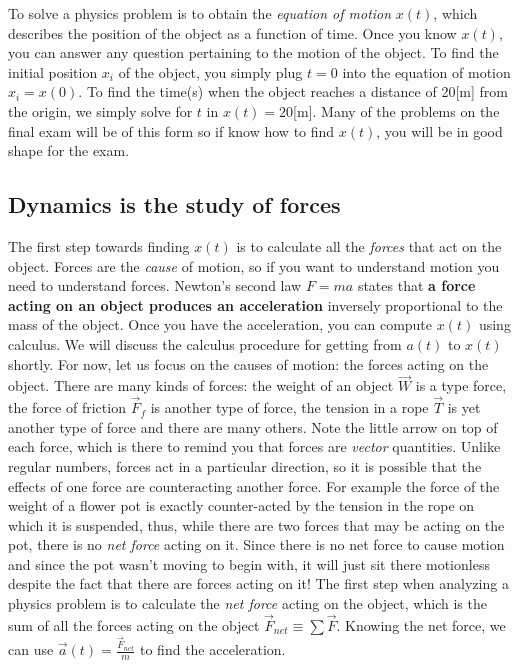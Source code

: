

To solve a physics problem is to obtain the \emph{equation of motion} $x(t)$, 
which describes the position of the object as a function of time.
%
Once you know $x(t)$, you can answer any question pertaining to the motion of the object.
To find the initial position $x_i$ of the object, you simply plug $t=0$ into the equation of motion $x_i = x(0)$.
To find the time(s) when the object reaches a distance of 20[m] from the origin, we simply solve for $t$ in $x(t)=20$[m].
Many of the problems on the final exam will be of this form so if know how to find $x(t)$,
you will be in good shape for the exam.

\vspace{-3mm}
\subsection{Dynamics is the study of forces}
The first step towards finding $x(t)$ is to calculate all the \emph{forces} that act on the object.
Forces are the \emph{cause} of motion, so if you want to understand motion you need to understand forces. 
Newton's second law $F=ma$ states that {\bf a force acting on an object produces an acceleration}
inversely proportional to the mass of the object. 
Once you have the acceleration, you can compute $x(t)$ using calculus.
We will discuss the calculus procedure for getting from $a(t)$ to $x(t)$ shortly.
For now, let us focus on the causes of motion: the forces acting on the object.
There are many kinds of forces: the weight of an object $\vec{W}$ is a type force, 
the force of friction $\vec{F}_f$ is another type of force, the tension in a rope $\vec{T}$ is 
yet another type of force and there are many others.
Note the little arrow on top of each force, which is there to remind you that forces are \emph{vector} quantities.
Unlike regular numbers, forces act in a particular direction, so it is possible that the effects of 
one force are counteracting another force. For example the force of the weight of a flower pot 
is exactly counter-acted by the tension in the rope on which it is suspended, thus,
while there are two forces that may be acting on the pot, there is no \emph{net force} acting on it.
Since there is no net force to cause motion and since the pot wasn't moving to begin with, 
it will just sit there motionless despite the fact that there are forces acting on it!
The first step when analyzing a physics problem is to calculate the \emph{net force}
acting on the object, which is the sum of all the forces acting on the object $\vec{F}_{net} \equiv \sum \vec{F}$.
Knowing the net force, we can use $\vec{a}(t) = \frac{\vec{F}_{net}}{m}$ to find the acceleration.

